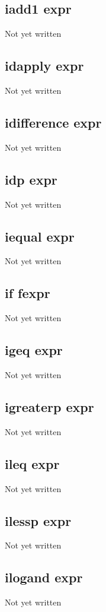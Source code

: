 \documentclass[a4paper,11pt]{article}
\begin{document}
\subsection{\ttfamily iadd1 expr}
Not yet written

\subsection{\ttfamily idapply expr}
Not yet written

\subsection{\ttfamily idifference expr}
Not yet written

\subsection{\ttfamily idp expr}
Not yet written

\subsection{\ttfamily iequal expr}
Not yet written

\subsection{\ttfamily if fexpr}
Not yet written

\subsection{\ttfamily igeq expr}
Not yet written

\subsection{\ttfamily igreaterp expr}
Not yet written

\subsection{\ttfamily ileq expr}
Not yet written

\subsection{\ttfamily ilessp expr}
Not yet written

\subsection{\ttfamily ilogand expr}
Not yet written
\end{document}

